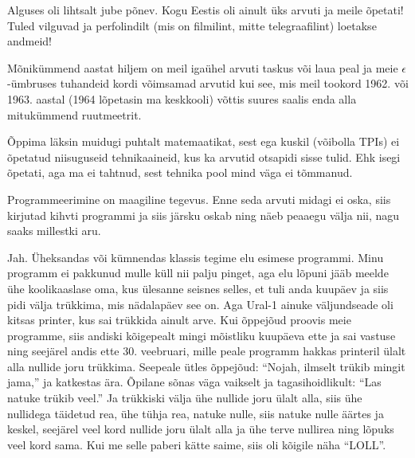 Alguses oli lihtsalt jube põnev. Kogu Eestis oli ainult üks arvuti ja meile
õpetati! Tuled vilguvad ja perfolindilt (mis on filmilint, mitte
telegraafilint) loetakse andmeid!

Mõnikümmend aastat hiljem on meil igaühel arvuti taskus või laua peal ja meie $\epsilon$-ümbruses tuhandeid kordi võimsamad arvutid kui see, mis meil tookord 1962. või 1963. aastal (1964 lõpetasin ma keskkooli) võttis suures
saalis enda alla mitukümmend ruutmeetrit.

Õppima läksin muidugi puhtalt matemaatikat, sest ega kuskil (võibolla TPIs) ei õpetatud niisuguseid
tehnikaaineid, kus ka arvutid otsapidi sisse tulid. Ehk isegi õpetati, aga ma
ei tahtnud, sest tehnika pool mind väga ei tõmmanud.

Programmeerimine on maagiline tegevus. Enne
seda arvuti midagi ei oska, siis kirjutad kihvti programmi ja
siis järsku oskab ning näeb peaaegu välja nii, nagu saaks
millestki aru.


Jah. Üheksandas või kümnendas klassis tegime elu esimese
programmi. Minu programm ei pakkunud mulle küll nii palju pinget, aga elu lõpuni
jääb meelde ühe koolikaaslase oma, kus ülesanne seisnes selles,
et tuli anda kuupäev ja siis pidi välja trükkima, mis nädalapäev see on. Aga
Ural-1 ainuke väljundseade oli
kitsas printer, kus sai trükkida ainult arve. Kui õppejõud proovis
meie programme, siis andiski kõigepealt mingi mõistliku kuupäeva ette ja sai
vastuse ning seejärel andis ette 30. veebruari, mille peale programm hakkas
printeril ülalt alla nullide joru trükkima. Seepeale ütles õppejõud:
\enquote{Nojah, ilmselt trükib mingit jama,} ja katkestas ära.
Õpilane sõnas väga vaikselt ja tagasihoidlikult: \enquote{Las natuke trükib veel.} Ja trükkiski välja ühe nullide joru ülalt alla, siis ühe
nullidega täidetud rea, ühe tühja rea, natuke nulle, siis natuke
nulle äärtes ja keskel, seejärel veel kord nullide joru
ülalt alla ja ühe terve nullirea ning lõpuks veel kord sama. Kui me selle
paberi kätte saime, siis oli kõigile näha \enquote{LOLL}.


